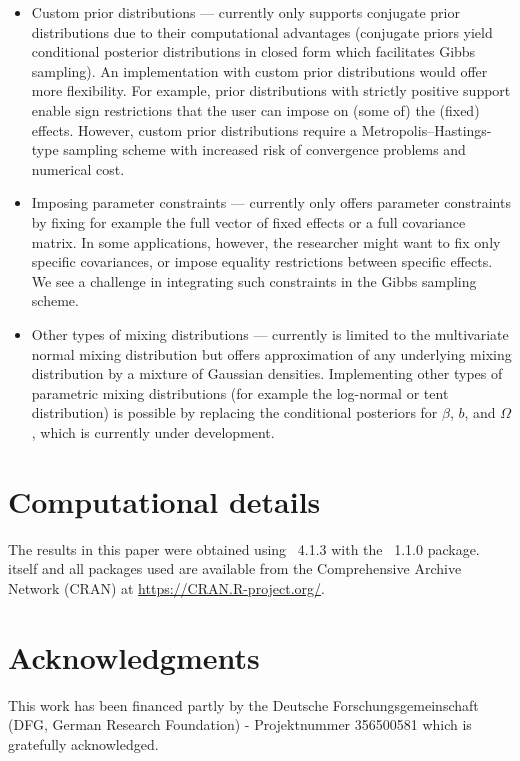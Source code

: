 \documentclass[article,shortnames]{jss}
\begin{document}
\begin{itemize}
  \item Custom prior distributions ---  currently only supports conjugate prior distributions due to their computational advantages (conjugate priors yield conditional posterior distributions in closed form which facilitates Gibbs sampling). An implementation with custom prior distributions would offer more flexibility. For example, prior distributions with strictly positive support enable sign restrictions that the user can impose on (some of) the (fixed) effects. However, custom prior distributions require a Metropolis–Hastings-type sampling scheme with increased risk of convergence problems and numerical cost.
  \item Imposing parameter constraints ---  currently only offers parameter constraints by fixing for example the full vector of fixed effects or a full covariance matrix. In some applications, however, the researcher might want to fix only specific covariances, or impose equality restrictions between specific effects. We see a challenge in integrating such constraints in the Gibbs sampling scheme.
  \item Other types of mixing distributions ---  currently is limited to the multivariate normal mixing distribution but offers approximation of any underlying mixing distribution by a mixture of Gaussian densities. Implementing other types of parametric mixing distributions (for example the log-normal or tent distribution) is possible by replacing the conditional posteriors for $\beta$, $b$, and $\Omega$, which is currently under development.
\end{itemize}

\section*{Computational details}

The results in this paper were obtained using
~4.1.3 with the
~1.1.0 package.  itself
and all packages used are available from the Comprehensive
 Archive Network (CRAN) at \url{https://CRAN.R-project.org/}.


\section*{Acknowledgments}

This work has been financed partly by the Deutsche Forschungsgemeinschaft (DFG, German Research Foundation) - Projektnummer 356500581 which is gratefully acknowledged.


\end{document}
